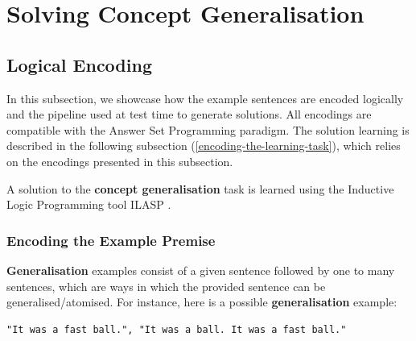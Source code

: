 \section{Solving Concept Generalisation}
\label{solving-generalisation-task}

\subsection{Logical Encoding}
\label{logical-encoding}

In this subsection, we showcase how the example sentences are encoded logically and the pipeline used at test time to generate solutions.
All encodings are compatible with the Answer Set Programming \cite{RefWorks:RefID:1-lifschitz2008answer} paradigm.
The solution learning is described in the following subsection (\ref{encoding-the-learning-task}), which relies on the encodings presented in this subsection. 


A solution to the \textbf{concept generalisation} task is learned using the Inductive Logic Programming tool ILASP \cite{RefWorks:RefID:18-law2020ilasp}.

\subsubsection{Encoding the Example Premise}

\textbf{Generalisation} examples consist of a given sentence followed by one to many sentences, which are ways in which the provided sentence can be generalised/atomised.
For instance, here is a possible \textbf{generalisation} example:
\begin{verbatim}
"It was a fast ball.", "It was a ball. It was a fast ball."
\end{verbatim}


